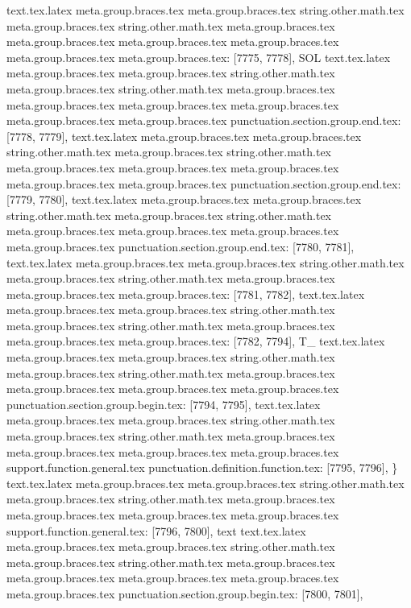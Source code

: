 {{{{{{{{{{{{{{{{{{{{{{{{{{{{{{{{{{{{{{{{{{{{{{{{{{{{{{{{{{{{{{{{{{{{{{{{{{{{{{{{{{{{{{{{{{{{{{{{{{{{{{{{{{{{{{{{{{{{{{{{{{{{{{{{{{{{{{{{{{{{{{{{{{{{{{{{{{{{{{{{{{{{{{{{{{{{{{{{{{{{{{{{{{{{{{{{{{{{{{{{{{{{{{{{{{{{{{{{{{{{{{{{{{{{{{{{{text.tex.latex meta.group.braces.tex meta.group.braces.tex string.other.math.tex meta.group.braces.tex string.other.math.tex meta.group.braces.tex meta.group.braces.tex meta.group.braces.tex meta.group.braces.tex meta.group.braces.tex meta.group.braces.tex: [7775, 7778], {SOL}
text.tex.latex meta.group.braces.tex meta.group.braces.tex string.other.math.tex meta.group.braces.tex string.other.math.tex meta.group.braces.tex meta.group.braces.tex meta.group.braces.tex meta.group.braces.tex meta.group.braces.tex meta.group.braces.tex punctuation.section.group.end.tex: [7778, 7779], {}}
text.tex.latex meta.group.braces.tex meta.group.braces.tex string.other.math.tex meta.group.braces.tex string.other.math.tex meta.group.braces.tex meta.group.braces.tex meta.group.braces.tex meta.group.braces.tex meta.group.braces.tex punctuation.section.group.end.tex: [7779, 7780], {}}
text.tex.latex meta.group.braces.tex meta.group.braces.tex string.other.math.tex meta.group.braces.tex string.other.math.tex meta.group.braces.tex meta.group.braces.tex meta.group.braces.tex meta.group.braces.tex punctuation.section.group.end.tex: [7780, 7781], {}}
text.tex.latex meta.group.braces.tex meta.group.braces.tex string.other.math.tex meta.group.braces.tex string.other.math.tex meta.group.braces.tex meta.group.braces.tex meta.group.braces.tex: [7781, 7782], {
}
text.tex.latex meta.group.braces.tex meta.group.braces.tex string.other.math.tex meta.group.braces.tex string.other.math.tex meta.group.braces.tex meta.group.braces.tex meta.group.braces.tex: [7782, 7794], {          T_}
text.tex.latex meta.group.braces.tex meta.group.braces.tex string.other.math.tex meta.group.braces.tex string.other.math.tex meta.group.braces.tex meta.group.braces.tex meta.group.braces.tex meta.group.braces.tex punctuation.section.group.begin.tex: [7794, 7795], {{}
text.tex.latex meta.group.braces.tex meta.group.braces.tex string.other.math.tex meta.group.braces.tex string.other.math.tex meta.group.braces.tex meta.group.braces.tex meta.group.braces.tex meta.group.braces.tex support.function.general.tex punctuation.definition.function.tex: [7795, 7796], {\}
text.tex.latex meta.group.braces.tex meta.group.braces.tex string.other.math.tex meta.group.braces.tex string.other.math.tex meta.group.braces.tex meta.group.braces.tex meta.group.braces.tex meta.group.braces.tex support.function.general.tex: [7796, 7800], {text}
text.tex.latex meta.group.braces.tex meta.group.braces.tex string.other.math.tex meta.group.braces.tex string.other.math.tex meta.group.braces.tex meta.group.braces.tex meta.group.braces.tex meta.group.braces.tex meta.group.braces.tex punctuation.section.group.begin.tex: [7800, 7801], {{}
}}}}}}}}}}}}}}}}}}}}}}}}}}}}}}}}}}}}}}}}}}}}}}}}}}}}}}}}}}}}}}}}}}}}}}}}}}}}}}}}}}}}}}}}}}}}}}}}}}}}}}}}}}}}}}}}}}}}}}}}}}}}}}}}}}}}}}}}}}}}}}}}}}}}}}}}}}}}}}}}}}}}}}}}}}}}}}}}}}}}}}}}}}}}}}}}}}}}}}}}}}}}}}}}}}}}}}}}}}}}}}}}}}}}}}}}}
